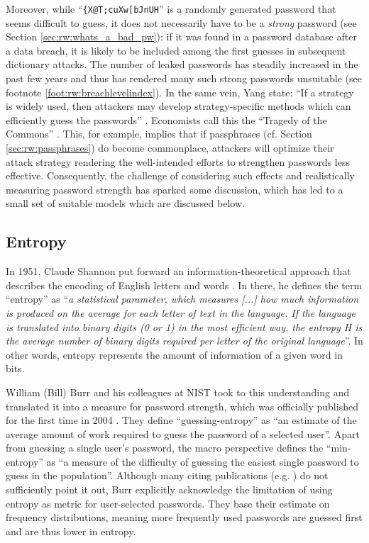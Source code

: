 Moreover, while ``\texttt{\{X@T;cuXw[bJnUH}'' is a randomly generated password that seems difficult to guess, it does not necessarily have to be a \textit{strong} password (see Section \ref{sec:rw:whats_a_bad_pw}): if it was found in a password database after a data breach, it is likely to be included among the first guesses in subsequent dictionary attacks. The number of leaked passwords has steadily increased in the past few years and thus has rendered many such strong passwords unsuitable (see footnote \ref{foot:rw:breachlevelindex}). In the same vein, Yang \etal state: ``If a strategy is widely used, then attackers may develop strategy-specific methods which can efficiently guess the passwords'' \cite{Yang2016MnemonicSentenceBased}. Economists call this the ``Tragedy of the Commons'' \cite{Hardin1968TragedyCommons}. This, for example, implies that if passphrases (cf. Section \ref{sec:rw:passphrases}) do become commonplace, attackers will optimize their attack strategy rendering the well-intended efforts to strengthen passwords less effective. Consequently, the challenge of considering such effects and realistically measuring password strength has sparked some discussion, which has led to a small set of suitable models which are discussed below.



	\subsection{Entropy}
	In 1951, Claude Shannon put forward an information-theoretical approach that describes the encoding of English letters and words \cite{Shannon1951Entropy}. In there, he defines the term ``entropy'' as ``\textit{a statistical parameter, which measures [...] how much information is produced on the average for each letter of text in the language. If the language is translated into binary digits (0 or 1) in the most efficient way, the entropy H is the average number of binary digits required per letter of the original language}''. In other words, entropy represents the amount of information of a given word in bits. 
	
	William (Bill) Burr and his colleagues at \gls{NIST} took to this understanding and translated it into a measure for password strength, which was officially published for the first time in 2004 \cite[Appendix A]{Burr2004NISTEntropy}. They define ``guessing-entropy'' as ``an estimate of the average amount of work required to guess the password of a selected user''. Apart from guessing a single user's password, the macro perspective defines the ``min-entropy'' as ``a measure of the difficulty of guessing the easiest single password to guess in the population''. Although many citing publications (e.g. \cite{Egelman2013DoesMyPasswordGoUpToEleven,Bonneau2012ScienceOfGuessing}) do not sufficiently point it out, Burr \etal explicitly acknowledge the limitation of using entropy as metric for user-selected passwords. They base their estimate on frequency distributions, meaning more frequently used passwords are guessed first and are thus lower in entropy. 
	
